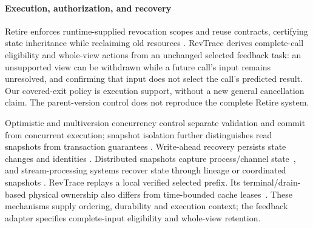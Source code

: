 \paragraph{Execution, authorization, and recovery}
Retire enforces runtime-supplied revocation scopes and reuse contracts,
certifying state inheritance while reclaiming old resources
\cite{zhang2026retire}.
RevTrace derives complete-call eligibility and whole-view actions from
an unchanged selected feedback task: an unsupported view can be withdrawn
while a future call's input remains unresolved, and confirming that input
does not select the call's predicted result. Our covered-exit policy
is execution support, without a new general cancellation claim. The
parent-version control does not reproduce the complete Retire system.

Optimistic and multiversion concurrency control separate validation and
commit from concurrent execution; snapshot isolation further distinguishes
read snapshots from transaction guarantees
\cite{kung1981occ,bernstein1983mvcc,berenson1995isolation}.
Write-ahead recovery persists state changes and identities
\cite{mohan1992aries}. Distributed snapshots capture process/channel
state~\cite{chandy1985snapshots}, and stream-processing systems recover
state through lineage or coordinated snapshots
\cite{zaharia2013dstreams,carbone2017flinkstate}. RevTrace replays a local
verified selected prefix. Its terminal/drain-based physical ownership
also differs from time-bounded cache leases~\cite{gray1989leases}.
These mechanisms supply ordering, durability and execution context;
the feedback adapter specifies complete-input eligibility and whole-view
retention.
